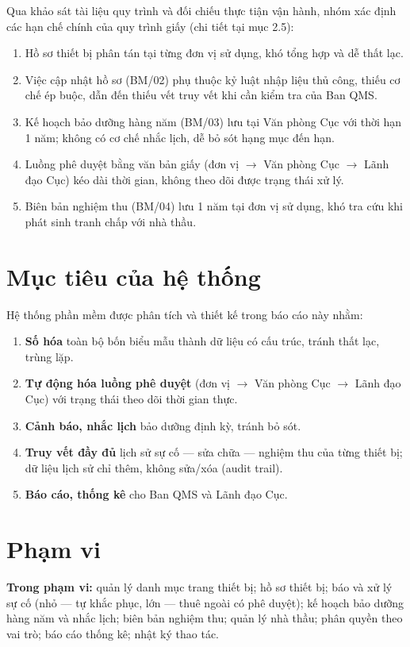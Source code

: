 Qua khảo sát tài liệu quy trình và đối chiếu thực tiận vận hành, nhóm xác định các hạn chế chính của quy trình giấy (chi tiết tại mục 2.5):
\begin{enumerate}
  \item Hồ sơ thiết bị phân tán tại từng đơn vị sử dụng, khó tổng hợp và dễ thất lạc.
  \item Việc cập nhật hồ sơ (BM/02) phụ thuộc kỷ luật nhập liệu thủ công, thiếu cơ chế ép buộc, dẫn đến thiếu vết truy vết khi cần kiểm tra của Ban QMS.
  \item Kế hoạch bảo dưỡng hàng năm (BM/03) lưu tại Văn phòng Cục với thời hạn 1 năm; không có cơ chế nhắc lịch, dễ bỏ sót hạng mục đến hạn.
  \item Luồng phê duyệt bằng văn bản giấy (đơn vị $\rightarrow$ Văn phòng Cục $\rightarrow$ Lãnh đạo Cục) kéo dài thời gian, không theo dõi được trạng thái xử lý.
  \item Biên bản nghiệm thu (BM/04) lưu 1 năm tại đơn vị sử dụng, khó tra cứu khi phát sinh tranh chấp với nhà thầu.
\end{enumerate}

\section{Mục tiêu của hệ thống}

Hệ thống phần mềm được phân tích và thiết kế trong báo cáo này nhằm:
\begin{enumerate}
  \item \textbf{Số hóa} toàn bộ bốn biểu mẫu thành dữ liệu có cấu trúc, tránh thất lạc, trùng lặp.
  \item \textbf{Tự động hóa luồng phê duyệt} (đơn vị $\rightarrow$ Văn phòng Cục $\rightarrow$ Lãnh đạo Cục) với trạng thái theo dõi thời gian thực.
  \item \textbf{Cảnh báo, nhắc lịch} bảo dưỡng định kỳ, tránh bỏ sót.
  \item \textbf{Truy vết đầy đủ} lịch sử sự cố --- sửa chữa --- nghiệm thu của từng thiết bị; dữ liệu lịch sử chỉ thêm, không sửa/xóa (audit trail).
  \item \textbf{Báo cáo, thống kê} cho Ban QMS và Lãnh đạo Cục.
\end{enumerate}

\section{Phạm vi}

\textbf{Trong phạm vi:} quản lý danh mục trang thiết bị; hồ sơ thiết bị; báo và xử lý sự cố (nhỏ — tự khắc phục, lớn — thuê ngoài có phê duyệt); kế hoạch bảo dưỡng hàng năm và nhắc lịch; biên bản nghiệm thu; quản lý nhà thầu; phân quyền theo vai trò; báo cáo thống kê; nhật ký thao tác.

